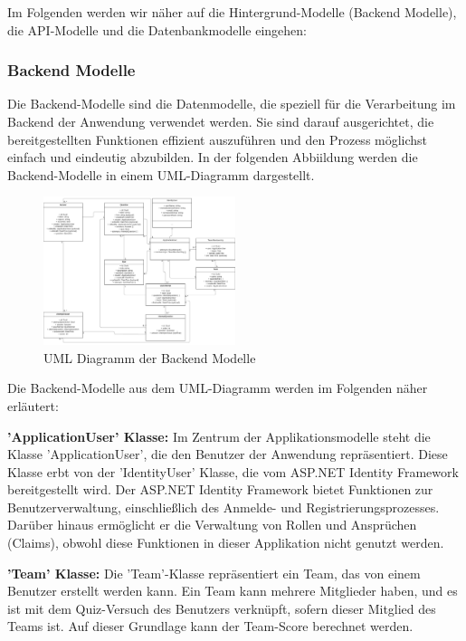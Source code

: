 \noindent Im Folgenden werden wir näher auf die Hintergrund-Modelle (Backend Modelle), die API-Modelle und die Datenbankmodelle eingehen:

\subsubsection{Backend Modelle}

Die Backend-Modelle sind die Datenmodelle, die speziell für die Verarbeitung im Backend der Anwendung verwendet werden. 
Sie sind darauf ausgerichtet, die bereitgestellten Funktionen effizient auszuführen und den Prozess möglichst einfach und 
eindeutig abzubilden. In der folgenden Abbiildung werden die Backend-Modelle in einem UML-Diagramm dargestellt.

\begin{figure}[H]
  \centering
  \includegraphics[width=0.5\textwidth]{img/UML-Klasse.png}
  \caption{UML Diagramm der Backend Modelle}
\end{figure}

\noindent Die Backend-Modelle aus dem UML-Diagramm werden im Folgenden näher erläutert:\newline

\noindent\textbf{'ApplicationUser' Klasse:} Im Zentrum der Applikationsmodelle steht die Klasse 'ApplicationUser', die den Benutzer der Anwendung repräsentiert. 
Diese Klasse erbt von der 'IdentityUser' Klasse, die vom ASP.NET Identity Framework bereitgestellt wird. Der ASP.NET Identity Framework 
bietet Funktionen zur Benutzerverwaltung, einschließlich des Anmelde- und Registrierungsprozesses. Darüber hinaus ermöglicht er die 
Verwaltung von Rollen und Ansprüchen (Claims), obwohl diese Funktionen in dieser Applikation nicht genutzt werden. \newline

\noindent\textbf{'Team' Klasse:} Die 'Team'-Klasse repräsentiert ein Team, das von einem Benutzer erstellt werden kann. 
Ein Team kann mehrere Mitglieder haben, und es ist mit dem Quiz-Versuch des Benutzers verknüpft, sofern dieser Mitglied des Teams ist. 
Auf dieser Grundlage kann der Team-Score berechnet werden. \newline

